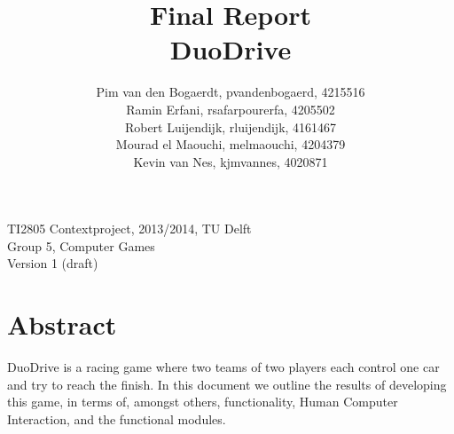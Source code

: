 \documentclass[11pt,twoside,a4paper]{article}
\title{
  Final Report\\
  DuoDrive
}
\author{
    Pim van den Bogaerdt, pvandenbogaerd, 4215516\\
    Ramin Erfani, rsafarpourerfa, 4205502\\
    Robert Luijendijk, rluijendijk, 4161467\\
    Mourad el Maouchi, melmaouchi, 4204379\\
    Kevin van Nes, kjmvannes, 4020871
}
\begin{document}
\maketitle

\begin{center}
TI2805 Contextproject, 2013/2014, TU Delft\\
Group 5, Computer Games\\
Version 1 (draft)
\end{center}

\clearpage

\section*{Abstract}
DuoDrive is a racing game where two teams of two players each control one car and try to reach the finish. In this document we outline the results of developing this game, in terms of, amongst others, functionality, Human Computer Interaction, and the functional modules.

\clearpage

\tableofcontents

\clearpage

\end{document}
